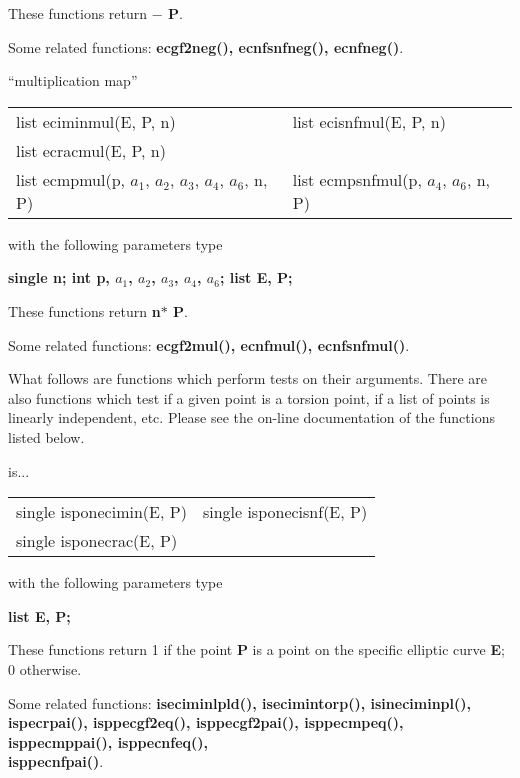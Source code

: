 These functions return {\bf $-$ P}.

Some related functions:\hspace*{0.7em}
{\bf ecgf2neg(), ecnfsnfneg(), ecnfneg()}.

\leer\leer
\begin{center} ``multiplication map'' \end{center}
\begin{center}
{\bf
\begin{tabular}{ll}
list eciminmul(E, P, n)   & list ecisnfmul(E, P, n)   \\
list ecracmul(E, P, n)  &  \\
list ecmpmul(p, $a_1$, $a_2$, $a_3$, $a_4$, $a_6$, n, P)   & list ecmpsnfmul(p, $a_4$, $a_6$, n, P)   
\end{tabular} }
\end{center}
\parbox[t]{2.5in}{with the following parameters type}
\parbox[t]{3.0in}{
\bf single n;\newline
    int p, $a_1$, $a_2$, $a_3$, $a_4$, $a_6$;\newline
    list E, P;}

These functions return {\bf n$*$ P}.

Some related functions:\hspace*{0.7em}
{\bf ecgf2mul(), ecnfmul(), ecnfsnfmul()}.


\leer\leer
What follows are functions which perform tests on their arguments.
There are also 
functions which test if a given point is a torsion point, if a list of points
is linearly independent, etc. Please see the on-line documentation of the
functions listed below.


\begin{center} is... \end{center}
\begin{center}
{\bf
\begin{tabular}{ll}
single isponecimin(E, P) & single isponecisnf(E, P) \\
single isponecrac(E, P) & 
\end{tabular} }
\end{center}
\parbox[t]{2.5in}{with the following parameters type}
\parbox[t]{3.0in}{
\bf list E, P;}

These functions return 1 if the point {\bf P} is a point on the specific  
elliptic curve {\bf E}; 0 otherwise.

Some related functions:\hspace*{0.7em}
{\bf iseciminlpld(), isecimintorp(), isineciminpl(), ispecrpai(), \newline
isppecgf2eq(), isppecgf2pai(), isppecmpeq(), isppecmppai(), isppecnfeq(),
\\
isppecnfpai()}.

